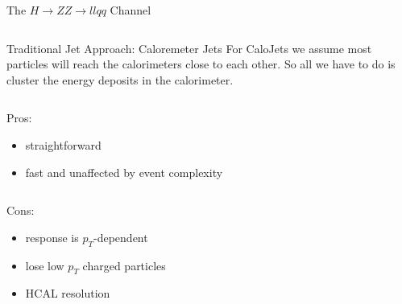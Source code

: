 \begin{frame}{The $H \rightarrow ZZ \rightarrow llqq$ Channel}
\begin{center}
\begin{columns}
\begin{column}{0.3\textwidth}
  \end{column}
\end{columns}

\end{center}
\end{frame}





\begin{frame}{Traditional Jet Approach: Caloremeter Jets}
For CaloJets we assume most particles will reach the calorimeters close to each other.  So all we have to do is cluster the energy deposits in the calorimeter.

\begin{columns}[T]
  \begin{column}{0.6\textwidth}
    \vspace{2em}
    \begin{column}{0.5\textwidth}
      Pros:
      \begin{itemize}
      \item
        straightforward
      \item
        fast and unaffected by event complexity
      \end{itemize}
    \end{column}
    \begin{column}{0.5\textwidth}
      Cons:
      \begin{itemize}
      \item
        response is $p_{T}$-dependent
      \item
        lose low $p_{T}$ charged particles
      \item
        HCAL resolution
      \end{itemize}
    \end{column}
  \end{column}
  \begin{column}{0.40\textwidth}

\end{column}
\end{columns}
\end{frame}
